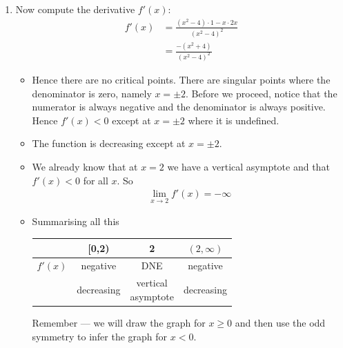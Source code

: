 \begin{eg}[$f(x) = \dfrac{x}{x^2-4}$]
\begin{enumerate}[(1)]
\item Now compute the derivative $f'(x)$:
\begin{align*}
f'(x)
&= \frac{(x^2-4)\cdot 1 - x\cdot 2x}{(x^2-4)^2}\\
&= \frac{-(x^2+4)}{(x^2-4)^2}
\end{align*}
\begin{itemize}
\item Hence there are no critical points. There are singular points
where the denominator is zero, namely $x=\pm2$. Before we proceed, notice that
the numerator is always negative and the denominator is always positive. Hence
$f'(x)<0$ except at $x=\pm 2$ where it is undefined.
\item The function is decreasing except at $x=\pm 2$.
\item We already know that at $x = 2$ we have a vertical asymptote and that
$f'(x)<0$ for all $x$. So
\begin{align*}
	\lim_{x\rightarrow 2} f'(x) = -\infty
\end{align*}

\item Summarising all this
\begin{center}
 \begin{tabular}{|c|c||c||c|}
\hline
& [0,2) & 2 & $(2,\infty)$\\
\hline
$f'(x)$  & negative & DNE & negative \\
\hline
& decreasing & \parbox{2cm}{\centering vertical\\asymptote} & decreasing \\
\hline
 \end{tabular}
\end{center}
Remember --- we will draw the graph for $x\geq 0$ and then use the odd symmetry
to infer the graph for $x < 0$.


\end{itemize}
\end{enumerate}
\end{eg}
